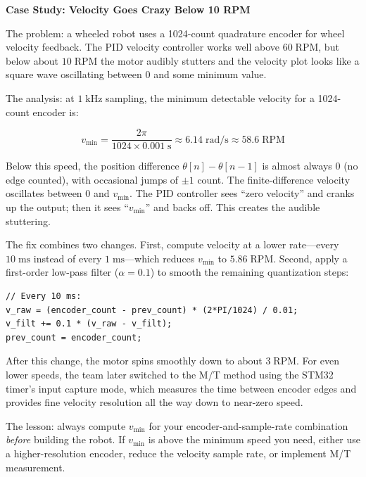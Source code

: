 \vspace{0.5em}
\begin{mdframed}[linewidth=1pt, innertopmargin=10pt, innerbottommargin=10pt]
\textbf{Case Study: Velocity Goes Crazy Below 10 RPM}

\vspace{0.3em}
The problem: a wheeled robot uses a 1024-count quadrature encoder for wheel velocity feedback. The PID velocity controller works well above $60\;\mathrm{RPM}$, but below about $10\;\mathrm{RPM}$ the motor audibly stutters and the velocity plot looks like a square wave oscillating between $0$ and some minimum value.

The analysis: at $1\;\mathrm{kHz}$ sampling, the minimum detectable velocity for a 1024-count encoder is:

\[
v_{\min} = \frac{2\pi}{1024 \times 0.001\;\mathrm{s}} \approx 6.14\;\mathrm{rad/s} \approx 58.6\;\mathrm{RPM}
\]

Below this speed, the position difference $\theta[n] - \theta[n-1]$ is almost always 0 (no edge counted), with occasional jumps of $\pm 1$ count. The finite-difference velocity oscillates between 0 and $v_{\min}$. The PID controller sees ``zero velocity'' and cranks up the output; then it sees ``$v_{\min}$'' and backs off. This creates the audible stuttering.

The fix combines two changes. First, compute velocity at a lower rate---every $10\;\mathrm{ms}$ instead of every $1\;\mathrm{ms}$---which reduces $v_{\min}$ to $5.86\;\mathrm{RPM}$. Second, apply a first-order low-pass filter ($\alpha = 0.1$) to smooth the remaining quantization steps:

\begin{verbatim}
// Every 10 ms:
v_raw = (encoder_count - prev_count) * (2*PI/1024) / 0.01;
v_filt += 0.1 * (v_raw - v_filt);
prev_count = encoder_count;
\end{verbatim}

After this change, the motor spins smoothly down to about $3\;\mathrm{RPM}$. For even lower speeds, the team later switched to the M/T method using the STM32 timer's input capture mode, which measures the time between encoder edges and provides fine velocity resolution all the way down to near-zero speed.

The lesson: always compute $v_{\min}$ for your encoder-and-sample-rate combination \textit{before} building the robot. If $v_{\min}$ is above the minimum speed you need, either use a higher-resolution encoder, reduce the velocity sample rate, or implement M/T measurement.
\end{mdframed}

